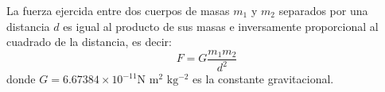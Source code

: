 \begin{tcolorbox}[
        colback=colorrds!5!white,
        colframe=colorrds!35!white,
        coltitle=black,
        fonttitle=\bfseries,
        center title,
        title=Ley de la Gravitación Universal
    ]
    La fuerza ejercida entre dos cuerpos de masas $m_1$ y $m_2$ separados por una distancia $d$ es igual al producto de sus masas e inversamente proporcional al cuadrado de la distancia, es decir:
    \[F=G\dfrac{m_1m_2}{d^2}\]
    donde $G=6.67384\times10^{-11} \text{N m$^2$ kg$^{-2}$} $ es la constante gravitacional.
\end{tcolorbox}